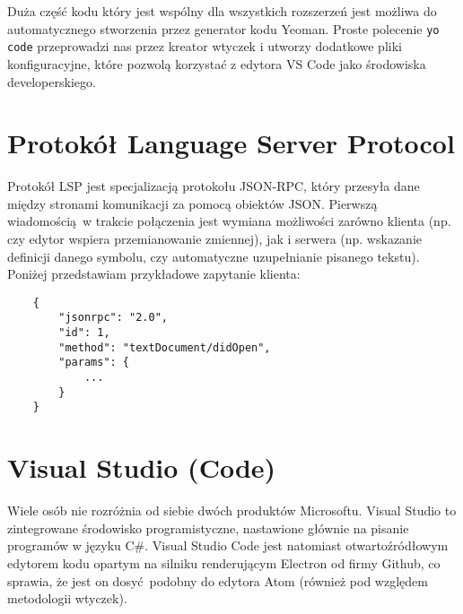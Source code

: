 Duża część kodu który jest wspólny dla wszystkich rozszerzeń jest możliwa do automatycznego stworzenia przez generator kodu Yeoman. Proste polecenie \texttt{yo code} przeprowadzi nas przez kreator wtyczek i utworzy dodatkowe pliki konfiguracyjne, które pozwolą korzystać z edytora VS Code jako środowiska developerskiego.

\section{Protokół Language Server Protocol}
Protokół LSP jest specjalizacją protokołu JSON-RPC, który przesyła dane między stronami komunikacji za pomocą obiektów JSON. Pierwszą wiadomością w trakcie połączenia jest wymiana możliwości zarówno klienta (np. czy edytor wspiera przemianowanie zmiennej), jak i serwera (np. wskazanie definicji danego symbolu, czy automatyczne uzupełnianie pisanego tekstu). Poniżej przedstawiam przykładowe zapytanie klienta:

\begin{lstlisting}
    {
        "jsonrpc": "2.0",
        "id": 1,
        "method": "textDocument/didOpen",
        "params": {
            ...
        }
    }
\end{lstlisting}

\section{Visual Studio (Code)}
Wiele osób nie rozróżnia od siebie dwóch produktów Microsoftu. Visual Studio to zintegrowane środowisko programistyczne, nastawione głównie na pisanie programów w języku C\#. Visual Studio Code jest natomiast otwartoźródłowym edytorem kodu opartym na silniku renderującym Electron od firmy Github, co sprawia, że jest on dosyć podobny do edytora Atom (również pod względem metodologii wtyczek). 
